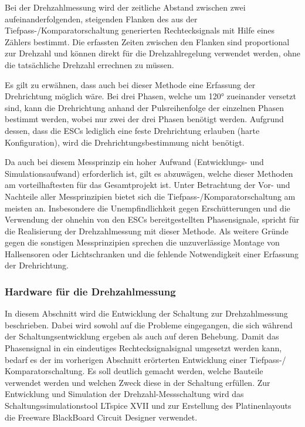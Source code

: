 Bei der Drehzahlmessung wird der zeitliche Abstand zwischen zwei aufeinanderfolgenden, steigenden Flanken des aus der Tiefpass-/Komparatorschaltung generierten Rechtecksignals mit Hilfe eines Zählers bestimmt. Die erfassten Zeiten zwischen den Flanken sind proportional zur Drehzahl und können direkt für die Drehzahlregelung verwendet werden, ohne die tatsächliche Drehzahl errechnen zu müssen.\vspace{11pt}

Es gilt zu erwähnen, dass auch bei dieser Methode eine Erfassung der Drehrichtung möglich wäre. Bei drei Phasen, welche um 120° zueinander versetzt sind, kann die Drehrichtung anhand der Pulsreihenfolge der einzelnen Phasen bestimmt werden, wobei nur zwei der drei Phasen benötigt werden. Aufgrund dessen, dass die ESCs lediglich eine feste Drehrichtung erlauben (harte Konfiguration), wird die Drehrichtungsbestimmung nicht benötigt.\vspace{11pt}

Da auch bei diesem Messprinzip ein hoher Aufwand (Entwicklungs- und Simulationsaufwand) erforderlich ist, gilt es abzuwägen, welche dieser Methoden am vorteilhaftesten für das Gesamtprojekt ist. Unter Betrachtung der Vor- und Nachteile aller Messprinzipien bietet sich die Tiefpass-/Komparatorschaltung am meisten an. Insbesondere die Unempfindlichkeit gegen Erschütterungen und die Verwendung der ohnehin von den ESCs bereitgestellten Phasensignale, spricht für die Realisierung der Drehzahlmessung mit dieser Methode. Als weitere Gründe gegen die sonstigen Messprinzipien sprechen die unzuverlässige Montage von Hallsensoren oder Lichtschranken und die fehlende Notwendigkeit einer Erfassung der Drehrichtung.

\newpage

\subsubsection{Hardware für die Drehzahlmessung}\label{Sec4Sub5Sub3}

In diesem Abschnitt wird die Entwicklung der Schaltung zur Drehzahlmessung beschrieben. Dabei wird sowohl auf die Probleme eingegangen, die sich während der Schaltungsentwicklung ergeben als auch auf deren Behebung. Damit das Phasensignal in ein eindeutiges Rechtecksignalsignal umgesetzt werden kann, bedarf es der im vorherigen Abschnitt erörterten Entwicklung einer Tiefpass-/ Komparatorschaltung. Es soll deutlich gemacht werden, welche Bauteile verwendet werden und welchen Zweck diese in der Schaltung erfüllen. Zur Entwicklung und Simulation der Drehzahl-Messschaltung wird das Schaltungssimulationstool LTspice XVII und zur Erstellung des Platinenlayouts die Freeware BlackBoard Circuit Designer verwendet.\vspace{11pt}

